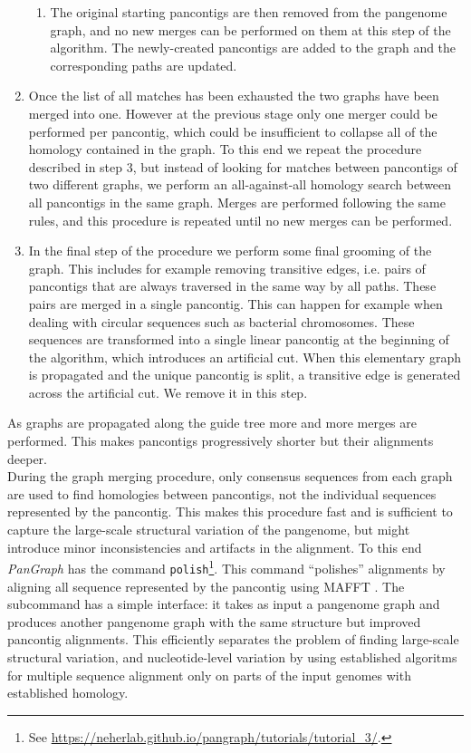 \documentclass[aps,rmp,reprint,superscriptaddress,notitlepage,10pt,onecolumn]{revtex4-1}
\begin{document}
\begin{enumerate}
\begin{enumerate}
              \item The original starting pancontigs are then removed from the pangenome graph, and no new merges can be performed on them at this step of the algorithm. The newly-created pancontigs are added to the graph and the corresponding paths are updated.
          \end{enumerate}
    \item Once the list of all matches has been exhausted the two graphs have been merged into one. However at the previous stage only one merger could be performed per pancontig, which could be insufficient to collapse all of the homology contained in the graph. To this end we repeat the procedure described in step 3, but instead of looking for matches between pancontigs of two different graphs, we perform an all-against-all homology search between all pancontigs in the same graph. Merges are performed following the same rules, and this procedure is repeated until no new merges can be performed.
    \item In the final step of the procedure we perform some final grooming of the graph. This includes for example removing transitive edges, i.e. pairs of pancontigs that are always traversed in the same way by all paths. These pairs are merged in a single pancontig. This can happen for example when dealing with circular sequences such as bacterial chromosomes. These sequences are transformed into a single linear pancontig at the beginning of the algorithm, which introduces an artificial cut. When this elementary graph is propagated and the unique pancontig is split, a transitive edge is generated across the artificial cut. We remove it in this step.
\end{enumerate}

As graphs are propagated along the guide tree more and more merges are performed. This makes pancontigs progressively shorter but their alignments deeper.\\

During the graph merging procedure, only consensus sequences from each graph are used to find homologies between pancontigs, not the individual sequences represented by the pancontig. 
This makes this procedure fast and is sufficient to capture the large-scale structural variation of the pangenome, but might introduce minor inconsistencies and artifacts in the alignment. To this end \textit{PanGraph} has the command \verb|polish|\footnote{See \url{https://neherlab.github.io/pangraph/tutorials/tutorial_3/}.}. This command ``polishes'' alignments by aligning all sequence represented by the pancontig using MAFFT \cite{katoh2002mafft}. 
The subcommand has a simple interface: it takes as input a pangenome graph and produces another pangenome graph with the same structure but improved pancontig alignments. This efficiently separates the problem of finding large-scale structural variation, and nucleotide-level variation by using established algoritms for multiple sequence alignment only on parts of the input genomes with established homology.
\end{document}
